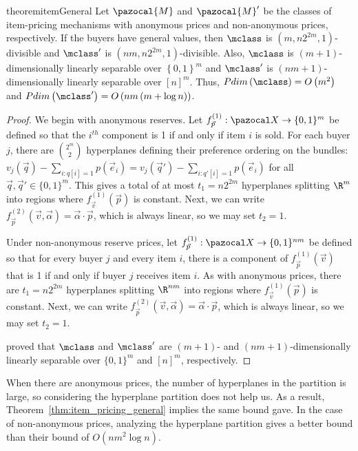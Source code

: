 \begin{restatable}{theorem}{itemGeneral}\label{thm:item_pricing_general}
Let $\pazocal{M}$ and $\pazocal{M}'$ be the classes of item-pricing mechanisms with anonymous prices and non-anonymous prices, respectively. If the buyers have general values, then $\mclass$ is $\left(m, n2^{2m}, 1\right)$-divisible and $\mclass'$ is $\left(nm,n2^{2m},1\right)$-divisible. Also, $\mclass$ is $\left(m+1\right)$-dimensionally linearly separable over $\left\{0,1\right\}^m$ and $\mclass'$ is $\left(nm+1\right)$-dimensionally linearly separable over $[n]^m$. Thus, $Pdim\left(\mclass\right) = O\left(m^2\right)$ and $Pdim\left(\mclass'\right) = O\left(nm\left(m + \log n\right)\right)$.
\end{restatable}
%

\begin{proof}
We begin with anonymous reserves. Let $f_{\vec{p}}^{(1)}: \domain \to \{0,1\}^m$ be defined so that the $i^{th}$ component is 1 if and only if item $i$ is sold. For each buyer $j$, there are ${2^m \choose 2}$ hyperplanes defining their preference ordering on the bundles: $v_j(\vec{q}) - \sum_{i: q[i] = 1} p(\vec{e}_i) = v_j(\vec{q}') - \sum_{i: q'[i] = 1} p(\vec{e}_i)$ for all $\vec{q}, \vec{q}' \in \{0,1\}^m$. This gives a total of at most $t_1 = n2^{2m}$ hyperplanes splitting $\R^m$ into regions where $f_{\vec{v}}^{(1)}(\vec{p})$ is constant. Next, we can write $f_{\vec{p}}^{(2)}(\vec{v}, \vec{\alpha}) = \vec{\alpha} \cdot \vec{p}$, which is always linear, so we may set $t_2 = 1$.

Under non-anonymous reserve prices, let $f_{\vec{p}}^{(1)}: \domain \to \{0,1\}^{nm}$ be defined so that for every buyer $j$ and every item $i$, there is a component of $f_{\vec{p}}^{(1)}(\vec{v})$ that is 1 if and only if buyer $j$ receives item $i$. As with anonymous prices, there are $t_1 = n2^{2m}$ hyperplanes splitting $\R^{nm}$ into regions where $f_{\vec{v}}^{(1)}(\vec{p})$ is constant. Next, we can write $f_{\vec{p}}^{(2)}(\vec{v}, \vec{\alpha}) = \vec{\alpha} \cdot \vec{p}$, which is always linear, so we may set $t_2 = 1$.

\citet{Morgenstern16:Learning} proved that $\mclass$ and $\mclass'$ are $(m+1)$- and $(nm+1)$-dimensionally linearly separable over $\{0,1\}^m$ and $[n]^m$, respectively.
\end{proof}


When there are anonymous prices, the number of hyperplanes in the partition is large, so considering the hyperplane partition does not help us. As a result, Theorem~\ref{thm:item_pricing_general} implies the same bound \citet{Morgenstern16:Learning} gave. In the case of non-anonymous prices, analyzing the hyperplane partition gives a better bound than their bound of $O\left(nm^2 \log n\right)$.


